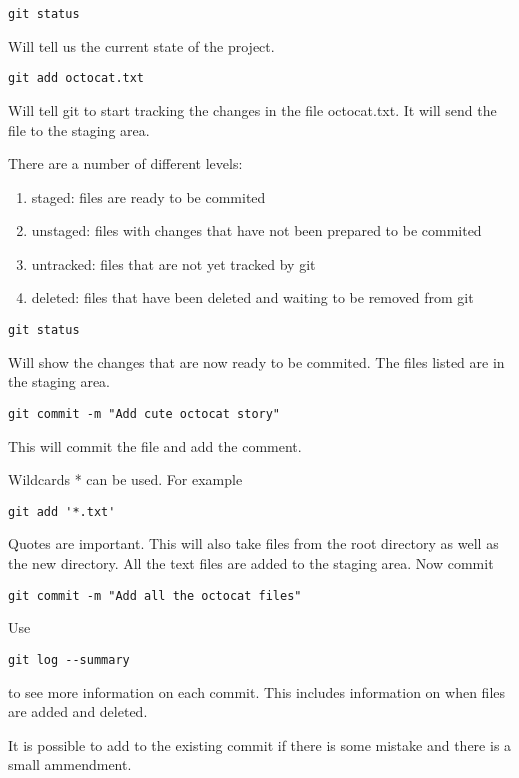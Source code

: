 \documentclass[11pt]{article} %
\begin{document}
\begin{lstlisting}
git status
\end{lstlisting}

Will tell us the current state of the project. 

\begin{lstlisting}
git add octocat.txt 
\end{lstlisting}

Will tell git to start tracking the changes in the file octocat.txt.  It will send the file to the staging area. 

There are a number of different levels: 
\begin{enumerate}
\item staged:  files are ready to be commited
\item unstaged: files with changes that have not been prepared to be commited
\item untracked: files that are not yet tracked by git
\item deleted:  files that have been deleted and waiting to be removed from git
\end{enumerate}

 \begin{lstlisting}
git status 
\end{lstlisting}
 Will show the changes that are now ready to be commited.  The files listed are in the staging area. 

\begin{lstlisting}
git commit -m "Add cute octocat story" 
\end{lstlisting}

This will commit the file and add the comment. 

Wildcards * can be used.  For example 
\begin{lstlisting}
git add '*.txt' 
\end{lstlisting}
Quotes are important.  This will also take files from the root directory as well as the new directory.  All the text files are added to the staging area. Now commit
\begin{lstlisting}
git commit -m "Add all the octocat files" 
\end{lstlisting}

Use 
\begin{lstlisting}
git log --summary 
\end{lstlisting}
to see more information on each commit.  This includes information on when files are added and deleted. 

It is possible to add to the existing commit if there is some mistake and there is a small ammendment. 
\end{document}
